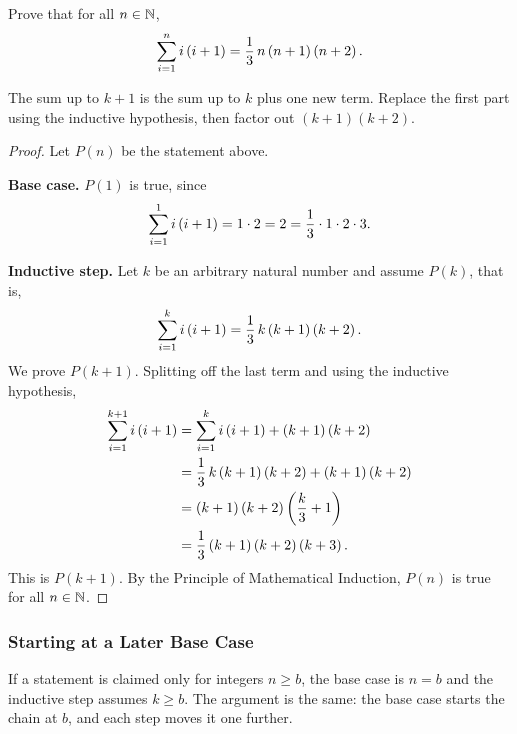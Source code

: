 \begin{example}
    Prove that for all $n \in \mathbb{N}$,
    \begin{equation*}
        \sum_{i = 1}^{n} i\left(i + 1\right) = \frac{1}{3}\, n \left(n + 1\right) \left(n + 2\right).
    \end{equation*}
\end{example}
\begin{remark}
    The sum up to $k+1$ is the sum up to $k$ plus one new term. Replace the
    first part using the inductive hypothesis, then factor out
    $(k+1)(k+2)$.
\end{remark}
\begin{proof}
    Let $P(n)$ be the statement above.

    \textbf{Base case.} $P(1)$ is true, since
    \begin{equation*}
        \sum_{i = 1}^{1} i\left(i + 1\right) = 1 \cdot 2 = 2 = \frac{1}{3} \cdot 1 \cdot 2 \cdot 3.
    \end{equation*}

    \textbf{Inductive step.} Let $k$ be an arbitrary natural number and
    assume $P(k)$, that is,
    \begin{equation*}
        \sum_{i = 1}^{k} i \left(i + 1\right) = \frac{1}{3}\, k\left(k + 1\right)\left(k + 2\right).
    \end{equation*}
    We prove $P(k + 1)$. Splitting off the last term and using the inductive
    hypothesis,
    \begin{align*}
        \sum_{i = 1}^{k + 1} i \left(i + 1\right)
        &= \sum_{i = 1}^{k} i\left(i + 1\right) + \left(k + 1\right)\left(k + 2\right) \\
        &= \frac{1}{3}\, k\left(k + 1\right)\left(k + 2\right) + \left(k + 1\right)\left(k + 2\right) \\
        &= \left(k + 1\right)\left(k + 2\right)\left(\frac{k}{3} + 1\right) \\
        &= \frac{1}{3} \left(k + 1\right)\left(k + 2\right)\left(k + 3\right).
    \end{align*}
    This is $P(k+1)$. By the Principle of Mathematical Induction, $P(n)$ is
    true for all $n \in \mathbb{N}$.
\end{proof}

\subsubsection{Starting at a Later Base Case}
If a statement is claimed only for integers $n\geq b$, the base case is
$n=b$ and the inductive step assumes $k\geq b$. The argument is the same:
the base case starts the chain at $b$, and each step moves it one further.


